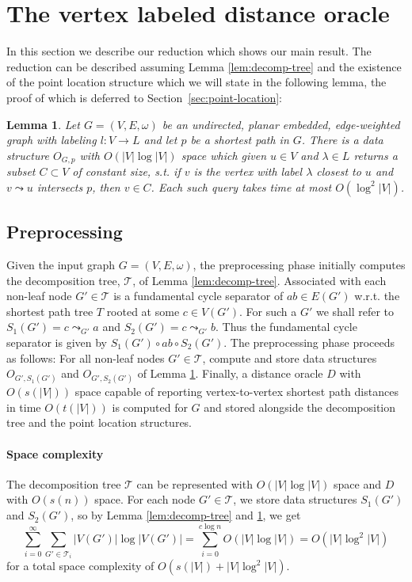 \documentclass[a4paper,UKenglish,cleveref, autoref, thm-restate]{article}
\newtheorem{lemma}{Lemma}
\begin{document}
\section{The vertex labeled distance oracle}\label{sec:vertex-labeled-dist-oracle}
In this section we describe our reduction which shows our main result. The reduction can be described assuming Lemma \ref{lem:decomp-tree} and the existence of the point location structure which we will state in the following lemma, the proof of which is deferred to Section~\ref{sec:point-location}:

\begin{lemma}\label{lem:point-location}
Let $G=(V,E,\omega)$ be an undirected, planar embedded, edge-weighted graph with labeling $l : V \rightarrow L$ and let $p$ be a shortest path in $G$. There is a data structure $O_{G,p}$ with $O(|V| \log |V|)$ space which given $u \in V$ and $\lambda \in L$ returns a subset $C \subset V$ of constant size, s.t. if  $v$ is the vertex with label $\lambda$ closest to $u$ and $v \leadsto u$ intersects $p$, then $v \in C$. Each such query takes time at most $O(\log^2 |V|)$.
\end{lemma}

\subsection{Preprocessing} 
Given the input graph $G=(V,E,\omega)$, the preprocessing phase initially computes the decomposition tree, $\mathcal{T}$, of Lemma \ref{lem:decomp-tree}. Associated with each non-leaf node $G' \in \mathcal{T}$ is a fundamental cycle separator of $ab \in E(G')$ w.r.t. the shortest path tree $T$ rooted at some $c \in V(G')$. For such a $G'$ we shall refer to $S_1(G')= c \leadsto_{G'} a$ and $S_2(G') = c \leadsto_{G'} b$. Thus the fundamental cycle separator is given by $S_1(G') \circ ab \circ S_2(G')$. The preprocessing phase proceeds as follows: For all non-leaf nodes $G' \in \mathcal{T}$, compute and store data structures $O_{G',S_1(G')}$ and $O_{G',S_2(G')}$ of Lemma \ref{lem:point-location}. Finally, a distance oracle $D$ with $O(s(|V|))$ space capable of reporting vertex-to-vertex shortest path distances in time $O(t(|V|))$ is computed for $G$ and stored alongside the decomposition tree and the point location structures.

\paragraph*{Space complexity} The decomposition tree $\mathcal{T}$ can be represented with $O(|V| \log |V|)$ space and $D$ with $O(s(n))$ space. For each node $G' \in \mathcal{T}$, we store data structures $S_1(G')$ and $S_2(G')$, so by Lemma \ref{lem:decomp-tree} and \ref{lem:point-location}, we get $$\sum_{i=0}^{\infty} \sum_{G' \in \mathcal{T}_i} |V(G')| \log |V(G')| = \sum_{i=0}^{c \log n} O(|V| \log |V|) = O(|V| \log^2 |V|)$$ for a total space complexity of $O(s(|V|) + |V| \log^2 |V|)$.
\end{document}
